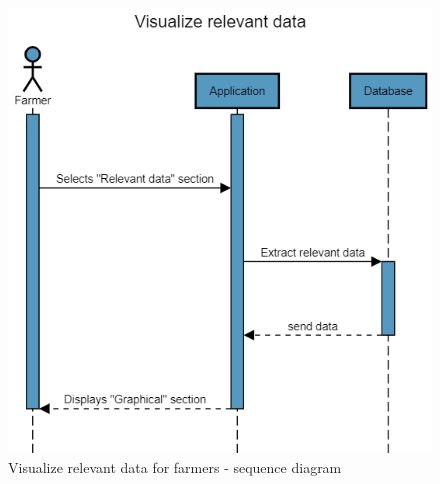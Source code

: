 \begin{figure}[H]
	\centering
    \includegraphics[page=1, scale=0.6]{Images/Sequence diagrams/SW2 - Visualize relevant data (fa).png}
	\caption{\label{fig:visualize_data_seq_diag}Visualize relevant data for farmers - sequence diagram}
\end{figure}